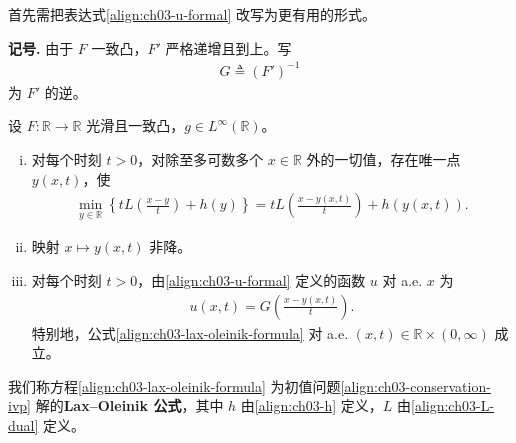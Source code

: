 \documentclass[../../main.tex]{subfiles}
\begin{document}
首先需把表达式\eqref{align:ch03-u-formal} 改写为更有用的形式。

\textbf{记号.} 由于 $F$ 一致凸，$F'$ 严格递增且到上。写
\begin{align}\label{align:ch03-G}
G\triangleq(F')^{-1}
\end{align}
为 $F'$ 的逆。

\begin{theorem}\label{theorem:ch03-lax-oleinik}设 $F:\mathbb{R}\to\mathbb{R}$ 光滑且一致凸，$g\in L^\infty(\mathbb{R})$。
\begin{enumerate}[(i)]
\item 对每个时刻 $t>0$，对除至多可数多个 $x\in\mathbb{R}$ 外的一切值，存在唯一点 $y(x,t)$，使
\begin{align*}
\min_{y\in\mathbb{R}}\left\{tL\!\left(\frac{x-y}{t}\right)+h(y)\right\}=tL\!\left(\frac{x-y(x,t)}{t}\right)+h(y(x,t)).
\end{align*}
\item 映射 $x\mapsto y(x,t)$ 非降。
\item 对每个时刻 $t>0$，由\eqref{align:ch03-u-formal} 定义的函数 $u$ 对 a.e. $x$ 为
\begin{align}\label{align:ch03-lax-oleinik-formula}
u(x,t)=G\!\left(\frac{x-y(x,t)}{t}\right).
\end{align}
特别地，公式\eqref{align:ch03-lax-oleinik-formula} 对 a.e. $(x,t)\in\mathbb{R}\times(0,\infty)$ 成立。
\end{enumerate}
\end{theorem}

我们称方程\eqref{align:ch03-lax-oleinik-formula} 为初值问题\eqref{align:ch03-conservation-ivp} 解的\textbf{Lax--Oleinik 公式}，其中 $h$ 由\eqref{align:ch03-h} 定义，$L$ 由\eqref{align:ch03-L-dual} 定义。
\end{document}
